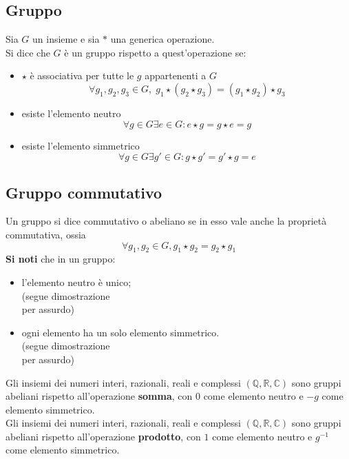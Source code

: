 \begin{flushleft}
\subsection{Gruppo}
Sia $G$ un insieme e sia $\ast$ una generica operazione.\\
Si dice che $G$ è un gruppo rispetto a quest'operazione se:
\begin{itemize}
    \item $\star$ è associativa per tutte le $g$ appartenenti a $G$
    \[\forall g_1,g_2,g_3 \in G,\;g_1\star (g_2\star g_3) = (g_1\star g_2) \star g_3 \]
    
    \item esiste l'elemento neutro
    \[\forall g\in G \exists e \in G: e\star g = g\star e = g\]
    
    \item esiste l'elemento simmetrico
    \[\forall g\in G\exists g' \in G: g\star g' = g' \star g = e\]
\end{itemize}


\subsection{Gruppo commutativo}
Un gruppo si dice commutativo o abeliano se in esso vale anche la proprietà commutativa, ossia
\[\forall g_1,g_2\in G,g_1 \star g_2 = g_2 \star g_1\]
\textbf{Si noti} che in un gruppo:
\begin{itemize}
    \item l'elemento neutro è unico;\\
(segue dimostrazione \\ \vspace{300px} per assurdo)
    \item ogni elemento ha un solo elemento simmetrico.\\
(segue dimostrazione \\ \vspace{300px} per assurdo)
\end{itemize}

Gli insiemi dei numeri interi, razionali, reali e complessi $(\mathbb{Q},\mathbb{R},\mathbb{C})$ sono gruppi abeliani rispetto all'operazione \textbf{somma}, con $0$ come elemento neutro e $-g$ come elemento simmetrico.\\

Gli insiemi dei numeri interi, razionali, reali e complessi $(\mathbb{Q},\mathbb{R},\mathbb{C})$ sono gruppi abeliani rispetto all'operazione \textbf{prodotto}, con $1$ come elemento neutro e $g^{-1}$ come elemento simmetrico.\\


\end{flushleft}
